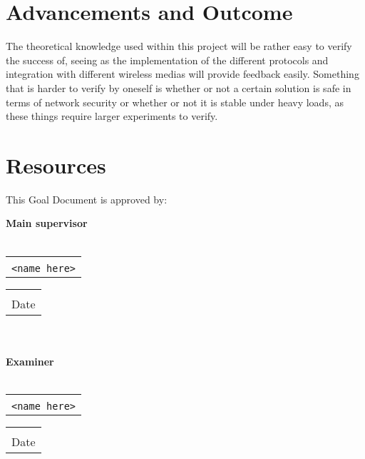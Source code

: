 \documentclass[a4paper]{article}
\makeatletter
\newcommand{\signature}[2]{%
	\noindent%
	\textbf{{#1}}\\\\
	\begin{tabular}{@{}p{2.5in}@{}}
		\\ \hline \\[-.75\normalbaselineskip]
		\texttt{{#2}}
	\end{tabular} \hspace{0in}
	\begin{tabular}{@{}p{2.5in}@{}}
		\\ \hline \\[-.75\normalbaselineskip]
		Date
	\end{tabular}\\
}
\makeatother
\begin{document}
\section{Advancements and Outcome}
The theoretical knowledge used within this project will be rather easy
to verify the success of, seeing as the implementation of the different 
protocols and integration with different wireless medias will provide
feedback easily. Something that is harder to verify by oneself is whether
or not a certain solution is safe in terms of network security or whether
or not it is stable under heavy loads, as these things require larger
experiments to verify.

\section{Resources}


This Goal Document is approved by:

\signature{Main supervisor}{<name here>}\\

\signature{Examiner}{<name here>}
\end{document}
